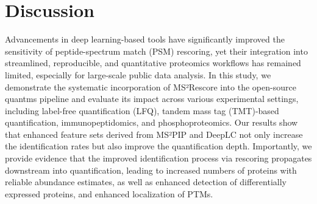 \documentclass[12pt]{article}
\begin{document}
\section{Discussion}
Advancements in deep learning-based tools have significantly improved the sensitivity of peptide-spectrum match (PSM) rescoring, yet their integration into streamlined, reproducible, and quantitative %
proteomics workflows has remained limited, especially for large-scale public data analysis. In this study, we demonstrate the systematic incorporation of MS²Rescore into the open-source quantms pipeline and evaluate its impact across various experimental settings, including label-free quantification (LFQ), tandem mass tag (TMT)-based quantification, immunopeptidomics, and phosphoproteomics. Our results show that enhanced feature sets derived from MS²PIP and DeepLC not only increase the identification rates but also improve the quantification depth. 
Importantly, we provide evidence that the improved identification process via rescoring propagates downstream into quantification, leading to increased numbers of proteins with reliable abundance estimates, as well as enhanced detection of differentially expressed proteins, and enhanced localization of PTMs. %
\end{document}
